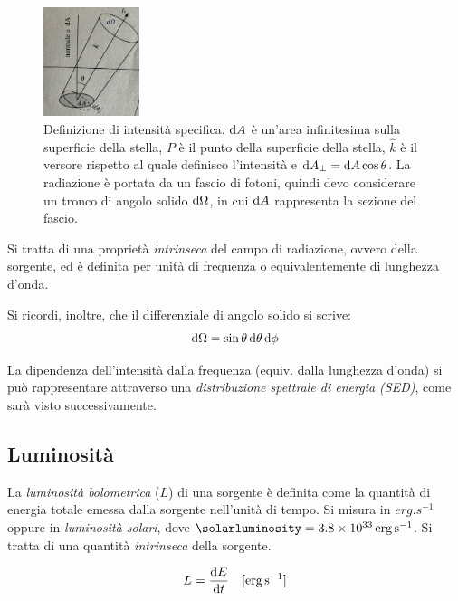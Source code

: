 \begin{figure}
\centering
\includegraphics[width=0.25\textwidth]{immagini/intensita-specifica.png}
\caption{Definizione di intensità specifica. $\ud A$ è un'area infinitesima sulla superficie della stella, $P$ è il punto della superficie della stella, $\hat{k}$ è il versore rispetto al quale definisco l'intensità e $\ud A_\perp = \ud A \cos{\theta}$. La radiazione è portata da un fascio di fotoni, quindi devo considerare un tronco di angolo solido $\ud \Omega$, in cui $\ud A$ rappresenta la sezione del fascio.}
\label{fig:intensità-specifica}
\end{figure}

Si tratta di una proprietà \emph{intrinseca} del campo di radiazione, ovvero della sorgente, ed è definita per unità di frequenza o equivalentemente di lunghezza d'onda.

Si ricordi, inoltre, che il differenziale di angolo solido si scrive:
\begin{equation}\label{eq:angolo-solido}
    \ud \Omega = \sin{\theta} \ud \theta \ud \phi
\end{equation}

La dipendenza dell'intensità dalla frequenza (equiv. dalla lunghezza d'onda) si può rappresentare attraverso una \emph{distribuzione spettrale di energia (SED)}, come sarà visto successivamente.

\subsection{Luminosità}\label{sec:luminosità}
La \emph{luminosità bolometrica} ($L$) di una sorgente è definita come la quantità di energia totale emessa dalla sorgente nell'unità di tempo. Si misura in $\si{erg.s^{-1}}$ oppure in \emph{luminosità solari}, dove $\si{\solarluminosity} = \SI{3.8e33}{erg.s^{-1}}$. Si tratta di una quantità \emph{intrinseca} della sorgente.

\begin{equation}\label{eq:def-luminosità-bolometrica}
    L = \frac{\ud E}{\ud t} \quad [\si{erg.s^{-1}}]
\end{equation}

